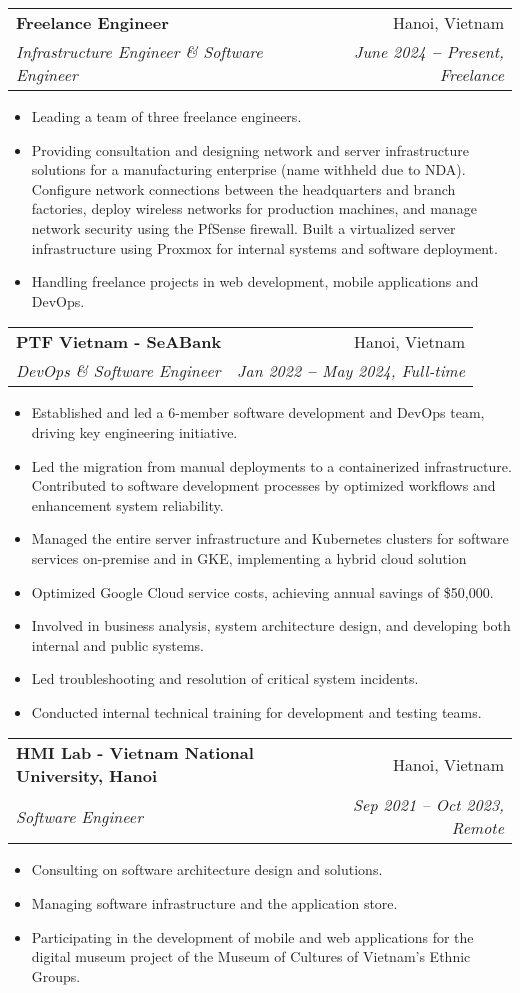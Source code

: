 \documentclass[letterpaper,11pt]{article}
\makeatletter
\newcommand{\resumeItem}[1]{
  \item\small{
    {#1 \vspace{-2pt}}
  }
}
\newcommand{\resumeSubheading}[4]{
  \vspace{-2pt}\item
    \begin{tabular*}{0.97\textwidth}[t]{l@{\extracolsep{\fill}}r}
      \textbf{#1} & #2 \\
      \textit{\small#3} & \textit{\small #4} \\
    \end{tabular*}\vspace{-7pt}
}
\newcommand{\resumeItemListStart}{\begin{itemize}}
\newcommand{\resumeItemListEnd}{\end{itemize}\vspace{-5pt}}
\makeatother
\begin{document}
    \resumeSubheading
      {Freelance Engineer}{Hanoi, Vietnam}
      {Infrastructure Engineer \& Software Engineer}{June 2024 \textbf{--} Present, Freelance}
        \resumeItemListStart
            \resumeItem{Leading a team of three freelance engineers.}
            \resumeItem{Providing consultation and designing network and server infrastructure solutions for a manufacturing enterprise (name withheld due to NDA). Configure network connections between the headquarters and branch factories, deploy wireless networks for production machines, and manage network security using the PfSense firewall. Built a virtualized server infrastructure using Proxmox for internal systems and software deployment.}
            \resumeItem{Handling freelance projects in web development, mobile applications and DevOps.}
        \resumeItemListEnd

    \resumeSubheading
      {PTF Vietnam - SeABank}{Hanoi, Vietnam}
      {DevOps \& Software Engineer}{Jan 2022 \textbf{--} May 2024, Full-time}
        \resumeItemListStart
            \resumeItem{Established and led a 6-member software development and DevOps team, driving key engineering initiative.}
            \resumeItem{Led the migration from manual deployments to a containerized infrastructure. Contributed to software development processes by optimized workflows and enhancement system reliability.}
            \resumeItem{Managed the entire server infrastructure and Kubernetes clusters for software services on-premise and in GKE, implementing a hybrid cloud solution}
            \resumeItem{Optimized Google Cloud service costs, achieving annual savings of \$50,000.}
            \resumeItem{Involved in business analysis, system architecture design, and developing both internal and public systems.}
            \resumeItem{Led troubleshooting and resolution of critical system incidents.}
            \resumeItem{Conducted internal technical training for development and testing teams.}
        \resumeItemListEnd

    \resumeSubheading
      {HMI Lab - Vietnam National University, Hanoi}{Hanoi, Vietnam}
      {Software Engineer}{Sep 2021 -- Oct 2023, Remote}
        \resumeItemListStart
            \resumeItem{Consulting on software architecture design and solutions.}
            \resumeItem{Managing software infrastructure and the application store.}
            \resumeItem{Participating in the development of mobile and web applications for the digital museum project of the Museum of Cultures of Vietnam's Ethnic Groups.}
        \resumeItemListEnd
\end{document}
